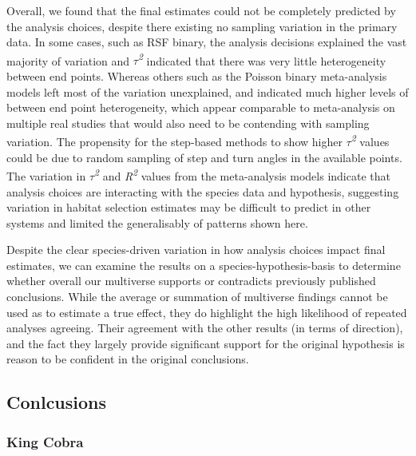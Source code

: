 \documentclass[10pt,a4paper]{article}
\begin{document}
Overall, we found that the final estimates could not be completely predicted by the analysis choices, despite there existing no sampling variation in the primary data.
In some cases, such as RSF binary, the analysis decisions explained the vast majority of variation and \emph{\(\tau\)\textsuperscript{2}} indicated that there was very little heterogeneity between end points.
Whereas others such as the Poisson binary meta-analysis models left most of the variation unexplained, and indicated much higher levels of between end point heterogeneity, which appear comparable to meta-analysis on multiple real studies that would also need to be contending with sampling variation.
The propensity for the step-based methods to show higher \emph{\(\tau\)\textsuperscript{2}} values could be due to random sampling of step and turn angles in the available points.
The variation in \emph{\(\tau\)\textsuperscript{2}} and \emph{R\textsuperscript{2}} values from the meta-analysis models indicate that analysis choices are interacting with the species data and hypothesis, suggesting variation in habitat selection estimates may be difficult to predict in other systems and limited the generalisably of patterns shown here.

Despite the clear species-driven variation in how analysis choices impact final estimates, we can examine the results on a species-hypothesis-basis to determine whether overall our multiverse supports or contradicts previously published conclusions.
While the average or summation of multiverse findings cannot be used as to estimate a true effect, they do highlight the high likelihood of repeated analyses agreeing.
Their agreement with the other results (in terms of direction), and the fact they largely provide significant support for the original hypothesis is reason to be confident in the original conclusions.

\subsection{Conlcusions}\label{conlcusions}

\subsubsection{King Cobra}\label{king-cobra-1}
\end{document}
